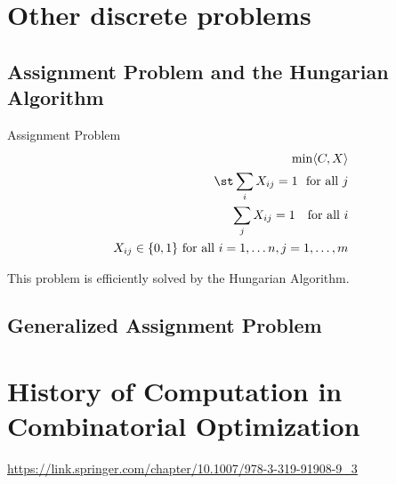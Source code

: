 
\section{Other discrete problems}
\subsection{Assignment Problem and the Hungarian Algorithm}
\begin{general}{Assignment Problem}{\polynomial}
\begin{equation}
\begin{split}
\min \langle C, X\rangle\\
\st  \sum_{i} X_{ij} = 1 \ \text{ for all } j\\
\sum_j X_{ij} = 1 \ \ \text{ for all } i\\
X_{ij} \in \{0,1\} \text{ for all } i=1, \dots n,  j=1, \dots, m
\end{split}
\end{equation}
\end{general}

This problem is efficiently solved by the Hungarian Algorithm.

\subsection{Generalized Assignment Problem}



\section{History of Computation in Combinatorial Optimization}


\url{https://link.springer.com/chapter/10.1007/978-3-319-91908-9_3}